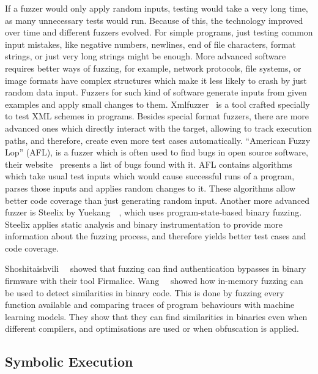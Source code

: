 If a fuzzer would only apply random inputs, testing would take a very long time,
as many unnecessary tests would run. Because of this, the technology improved
over time and different fuzzers evolved. For simple programs, just testing
common input mistakes, like negative numbers, newlines, end of file characters,
format strings, or just very long strings might be enough. More advanced
software requires better ways of fuzzing, for example, network protocols, file
systems, or image formats have complex structures which make it less likely to
crash by just random data input. Fuzzers for such kind of software generate
inputs from given examples and apply small changes to them.
Xmlfuzzer~\cite{xmlfuzzer} is a tool crafted specially to test XML schemes in
programs. Besides special format fuzzers, there are more advanced ones which
directly interact with the target, allowing to track execution paths, and
therefore, create even more test cases automatically. ``American Fuzzy Lop''
(AFL), is a fuzzer which is often used to find bugs in open source software,
their website~\cite{aflweb} presents a list of bugs found with it. AFL contains
algorithms which take usual test inputs which would cause successful runs of a
program, parses those inputs and applies random changes to it. These algorithms
allow better code coverage than just generating random input. Another more
advanced fuzzer is Steelix by Yuekang~\etal~\cite{steelix}, which uses
program-state-based binary fuzzing. Steelix applies static analysis and binary
instrumentation to provide more information about the fuzzing process, and
therefore yields better test cases and code coverage.

Shoshitaishvili~\etal~\cite{firmalice} showed that fuzzing can find
authentication bypasses in binary firmware with their tool Firmalice.
Wang~\etal~\cite{inmemfuzzing} showed how in-memory fuzzing can be used to
detect similarities in binary code. This is done by fuzzing every function
available and comparing traces of program behaviours with machine learning
models. They show that they can find similarities in binaries even when
different compilers, and optimisations are used or when obfuscation is applied.

\subsection{Symbolic Execution}

